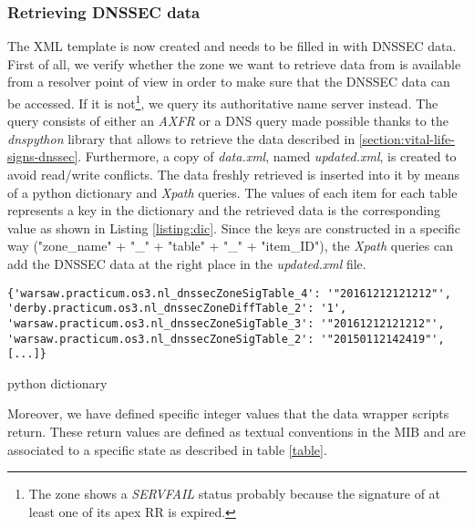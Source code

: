 \subsubsection{Retrieving DNSSEC data}
The XML template is now created and needs to be filled in with DNSSEC data. First of all, we verify whether the zone we want to retrieve data from is available from a resolver point of view in order to make sure that the DNSSEC data can be accessed. If it is not\footnote{The zone shows a \textit{SERVFAIL} status probably because the signature of at least one of its apex RR is expired.}, we query its authoritative name server instead. The query consists of either an \textit{AXFR} or a DNS query made possible thanks to the \textit{dnspython} library that allows to retrieve the data described in \ref{section:vital-life-signs-dnssec}. Furthermore, a copy of \textit{data.xml}, named \textit{updated.xml}, is created to avoid read/write conflicts. The data freshly retrieved is inserted into it by means of a python dictionary and \textit{Xpath} queries. The values of each item for each table represents a key in the dictionary and the retrieved data is the corresponding value as shown in Listing \ref{listing:dic}. Since the keys are constructed in a specific way ("zone\_name" + "\_" + "table" + "\_" + "item\_ID"), the \textit{Xpath} queries can add the DNSSEC data at the right place in the \textit{updated.xml} file. 
\begin{listing}
\begin{verbatim}
{'warsaw.practicum.os3.nl_dnssecZoneSigTable_4': '"20161212121212"',
'derby.practicum.os3.nl_dnssecZoneDiffTable_2': '1',
'warsaw.practicum.os3.nl_dnssecZoneSigTable_3': '"20161212121212"',
'warsaw.practicum.os3.nl_dnssecZoneSigTable_2': '"20150112142419"', 
[...]}
\end{verbatim}
\caption{python dictionary}
\label{listing:dic}
\end{listing}
Moreover, we have defined specific integer values that the data wrapper scripts return. These return values are defined as textual conventions in the MIB and are associated to a specific state as described in table \ref{table}. 



